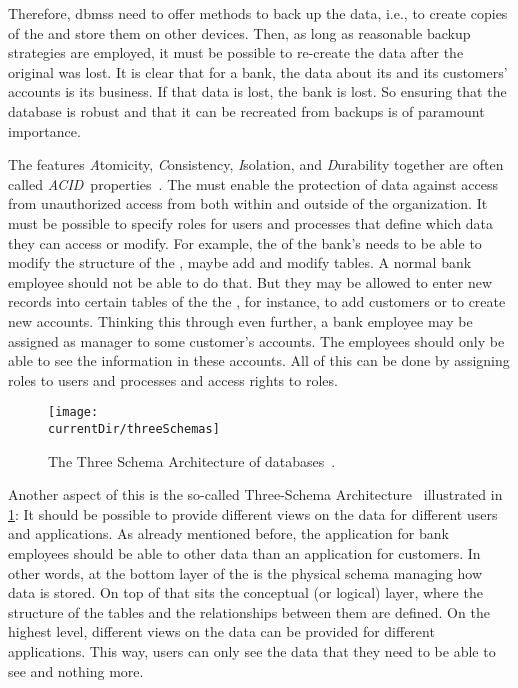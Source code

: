 Therefore, \glspl{dbms} need to offer methods to back up the data, i.e., to create copies of the  and store them on other devices.
Then, as long as reasonable backup strategies are employed, it must be possible to re-create the data after the original  was lost.
It is clear that for a bank, the data about its and its customers' accounts is its business.
If that data is lost, the bank is lost.
So ensuring that the database is robust and that it can be recreated from backups is of paramount importance.%
\endhsection%

The features \emph{A}tomicity, \emph{C}onsistency, \emph{I}solation, and \emph{D}urability together are often called \emph{ACID}~properties~\cite{GR1992TPCAT,WV2001TISTAATPOCCAR}.
%
\label{sec:featuresDataPrivacyAndSecurity}%
The  must enable the protection of data against access from unauthorized access from both within and outside of the organization.
It must be possible to specify roles for users and processes that define which data they can access or modify.
For example, the  of the bank's  needs to be able to modify the structure of the , maybe add and modify tables.
A normal bank employee should not be able to do that.
But they may be allowed to enter new records into certain tables of the the , for instance, to add customers or to create new accounts.
Thinking this through even further, a bank employee may be assigned as manager to some customer's accounts.
The employees should only be able to see the information in these accounts.
All of this can be done by assigning roles to users and processes and access rights to roles.

\begin{figure}%
\centering%
\texttt{[image: \\currentDir/threeSchemas]}%
\caption{The Three Schema Architecture of databases~\cite{AXSSGDMS1978FRODMS,TK1978TAXSDFROTSGODMS,BFJKMRGRT1985RMFDSDAFTGDOTAXSDSSG,SS2005EIDDDFDB:I}.}%
\label{fig:threeSchemas}%
\end{figure}

Another aspect of this is the so-called Three-Schema Architecture~\cite{AXSSGDMS1978FRODMS,TK1978TAXSDFROTSGODMS,BFJKMRGRT1985RMFDSDAFTGDOTAXSDSSG,SS2005EIDDDFDB:I} illustrated in \cref{fig:threeSchemas}:
It should be possible to provide different views on the data for different users and applications.
As already mentioned before, the application for bank employees should be able to  other data than an application for customers.
In other words, at the bottom layer of the  is the physical schema managing how data is stored.
On top of that sits the conceptual (or logical) layer, where the structure of the tables and the relationships between them are defined.
On the highest level, different views on the data can be provided for different applications.
This way, users can only see the data that they need to be able to see and nothing more.

